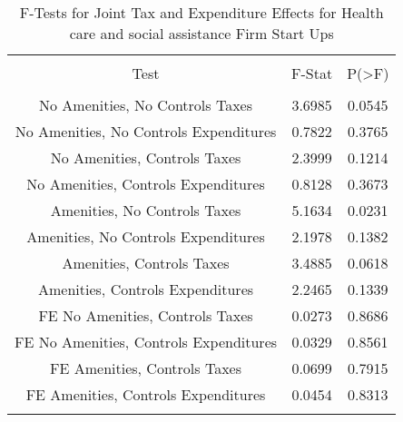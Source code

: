 
\begin{table}[!htbp] \centering 
  \caption{F-Tests for Joint Tax and Expenditure Effects for Health care and social assistance Firm Start Ups} 
  \label{62Ftests} 
\begin{tabular}{@{\extracolsep{5pt}} ccc} 
\\[-1.8ex]\hline 
\hline \\[-1.8ex] 
Test & F-Stat & P(\textgreater F) \\ 
\hline \\[-1.8ex] 
No Amenities, No Controls Taxes & 3.6985 & 0.0545 \\ 
No Amenities, No Controls Expenditures & 0.7822 & 0.3765 \\ 
No Amenities, Controls Taxes & 2.3999 & 0.1214 \\ 
No Amenities, Controls Expenditures & 0.8128 & 0.3673 \\ 
Amenities, No Controls Taxes & 5.1634 & 0.0231 \\ 
Amenities, No Controls Expenditures & 2.1978 & 0.1382 \\ 
Amenities, Controls Taxes & 3.4885 & 0.0618 \\ 
Amenities, Controls Expenditures & 2.2465 & 0.1339 \\ 
FE No Amenities, Controls Taxes & 0.0273 & 0.8686 \\ 
FE No Amenities, Controls Expenditures & 0.0329 & 0.8561 \\ 
FE Amenities, Controls Taxes & 0.0699 & 0.7915 \\ 
FE Amenities, Controls Expenditures & 0.0454 & 0.8313 \\ 
\hline \\[-1.8ex] 
\end{tabular} 
\end{table} 
